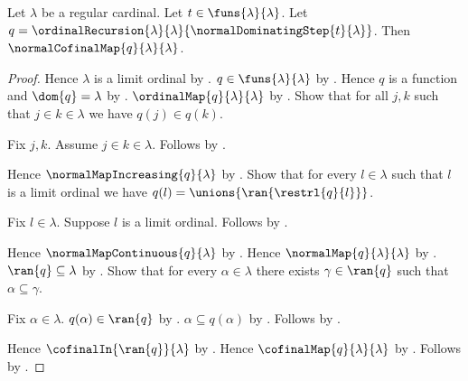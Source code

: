 \begin{theorem}\label{normal_dominating_recursion_is_normal_cofinal}
    Let $\lambda$ be a regular cardinal.
    Let $t\in\funs{\lambda}{\lambda}$.
    Let $q=\ordinalRecursion{\lambda}{\lambda}
        {\normalDominatingStep{t}{\lambda}}$.
    Then $\normalCofinalMap{q}{\lambda}{\lambda}$.
\end{theorem}
\begin{proof}
    Hence $\lambda$ is a limit ordinal by
        .
    $q\in\funs{\lambda}{\lambda}$ by
        .
    Hence $q$ is a function and $\dom{q}=\lambda$ by
        .
    $\ordinalMap{q}{\lambda}{\lambda}$ by .
    Show that for all $j,k$ such that $j\in k\in\lambda$ we have
        $q(j)\in q(k)$.
    \begin{subproof}
        Fix $j,k$.
        Assume $j\in k\in\lambda$.
        Follows by .
    \end{subproof}
    Hence $\normalMapIncreasing{q}{\lambda}$ by
        .
    Show that for every $l\in\lambda$ such that $l$ is a limit ordinal
        we have $q(l)=\unions{\ran{\restrl{q}{l}}}$.
    \begin{subproof}
        Fix $l\in\lambda$.
        Suppose $l$ is a limit ordinal.
        Follows by .
    \end{subproof}
    Hence $\normalMapContinuous{q}{\lambda}$ by
        .
    Hence $\normalMap{q}{\lambda}{\lambda}$ by .
    $\ran{q}\subseteq\lambda$ by .
    Show that for every $\alpha\in\lambda$ there exists
        $\gamma\in\ran{q}$ such that $\alpha\subseteq\gamma$.
    \begin{subproof}
        Fix $\alpha\in\lambda$.
        $q(\alpha)\in\ran{q}$ by .
        $\alpha\subseteq q(\alpha)$ by
            .
        Follows by \auto.
    \end{subproof}
    Hence $\cofinalIn{\ran{q}}{\lambda}$ by .
    Hence $\cofinalMap{q}{\lambda}{\lambda}$ by .
    Follows by .
\end{proof}

